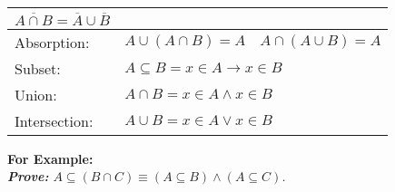 \begin{tabular}{|p{2cm}|l|l|}
    $\overline{A\cap B} = \overline{A} \cup \overline{B}$
    \\
    \hline
    \cellcolor{OliveGreen!10} Absorption:                                            & $A\cup (A\cap B) = A $                                          & $A\cap (A\cup B) = A$                        \\
    \hline
    \cellcolor{OliveGreen!10} Subset:                                                & \multicolumn{2}{l|}{$A\subseteq B = x\in A \rightarrow x\in B$}                                                \\
    \hline
    \cellcolor{OliveGreen!10} Union:                                                 & \multicolumn{2}{l|}{$A\cap B = x\in A \land x\in B$}                                                           \\
    \hline
    \cellcolor{OliveGreen!10} Intersection:                                          & \multicolumn{2}{l|}{$A\cup B = x\in A \lor x\in B$}                                                            \\
    \hline
\end{tabular}

\vspace{1em}

\noindent
\textbf{For Example:}\\

\noindent
\textit{\textbf{Prove:} $A\subseteq (B\cap C) \equiv (A\subseteq B) \land (A\subseteq C)$.}

